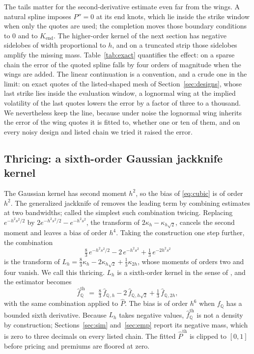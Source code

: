 \documentclass[preprint,12pt,authoryear,times]{elsarticle}
\newcommand{\Q}{\mathbb{Q}}
\newcommand{\fhat}{\hat f_{\Q}}
\begin{document}
The tails matter for the second-derivative estimate even far from the wings. A natural spline imposes \(P''=0\) at its end knots, which lie inside the strike window when only the quotes are used; the completion moves those boundary conditions to \(0\) and to \(K_{\mathrm{end}}\). The higher-order kernel of the next section has negative sidelobes of width proportional to \(h\), and on a truncated strip those sidelobes amplify the missing mass. Table~\ref{tab:exact} quantifies the effect: on a sparse chain the error of the quoted spline falls by four orders of magnitude when the wings are added. The linear continuation is a convention, and a crude one in the limit: on exact quotes of the listed-shaped mesh of Section~\ref{sec:designs}, whose last strike lies inside the evaluation window, a lognormal wing at the implied volatility of the last quotes lowers the error by a factor of three to a thousand. We nevertheless keep the line, because under noise the lognormal wing inherits the error of the wing quotes it is fitted to, whether one or ten of them, and on every noisy design and listed chain we tried it raised the error.

\subsection{Thricing: a sixth-order Gaussian jackknife kernel}
\label{sec:thrice}

The Gaussian kernel has second moment \(h^2\), so the bias of \eqref{eq:cubic} is of order \(h^2\). The generalized jackknife of \citet{schucanysommers1977} removes the leading term by combining estimates at two bandwidths; \citet{tukey1977} called the simplest such combination twicing. Replacing \(e^{-h^2s^2/2}\) by \(2e^{-h^2s^2/2}-e^{-h^2s^2}\), the transform of \(2\kappa_h-\kappa_{h\sqrt2}\), cancels the second moment and leaves a bias of order \(h^4\). Taking the construction one step further, the combination
\begin{equation}
\label{eq:phi-thrice}
\tfrac83\,e^{-h^2s^2/2}-2\,e^{-h^2s^2}+\tfrac13\,e^{-2h^2s^2}
\end{equation}
is the transform of \(L_h=\tfrac83\kappa_h-2\kappa_{h\sqrt2}+\tfrac13\kappa_{2h}\), whose moments of orders two and four vanish. We call this thricing. \(L_h\) is a sixth-order kernel in the sense of \citet{jonesfoster1993}, and the estimator becomes
\begin{equation}
\label{eq:thrice}
\fhat^{\mathrm{th}}
\;=\;
\tfrac83\,\fhat{}_{,h}-2\,\fhat{}_{,h\sqrt2}+\tfrac13\,\fhat{}_{,2h},
\end{equation}
with the same combination applied to \(\hat P\). The bias is of order \(h^6\) when \(f_{\Q}\) has a bounded sixth derivative. Because \(L_h\) takes negative values, \(\fhat^{\mathrm{th}}\) is not a density by construction; Sections~\ref{sec:sim} and~\ref{sec:emp} report its negative mass, which is zero to three decimals on every listed chain. The fitted \(\hat P^{\mathrm{th}}\) is clipped to \([0,1]\) before pricing and premiums are floored at zero.
\end{document}
